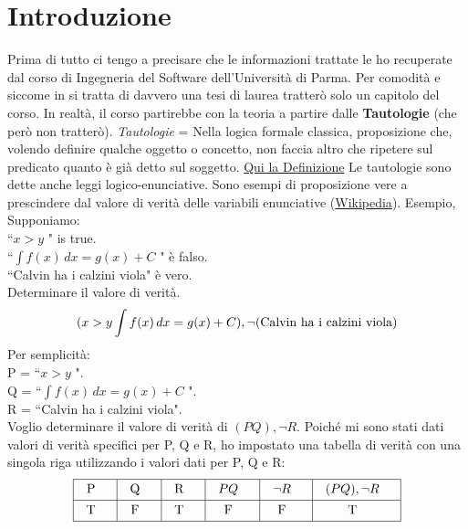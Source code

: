 \chapter*{Introduzione} %
Prima di tutto ci tengo a precisare che le informazioni trattate
le ho recuperate dal corso di Ingegneria del Software dell’Università di
Parma.
Per comodità e siccome in si tratta di davvero una tesi di laurea tratterò solo un capitolo del corso. 
\newline
In realtà, il corso partirebbe con la teoria a partire dalle \textbf{Tautologie} (che però non tratterò).
\newline
\emph{Tautologie} = Nella logica formale classica, proposizione che, volendo definire qualche oggetto o concetto, non faccia altro che ripetere sul predicato quanto è già detto sul soggetto. \href{https://www.google.com/search?q=Tautologie&oq=Tautologie&aqs=chrome..69i57j0i512l9.3456j1j15&sourceid=chrome&ie=UTF-8}{Qui la Definizione}
\newline
Le tautologie sono dette anche leggi logico-enunciative. Sono esempi di proposizione vere a prescindere dal valore di verità delle variabili enunciative (\href{https://it.wikipedia.org/wiki/Tautologia}{Wikipedia}).
%
\newline
\newline
%
Esempio, Supponiamo: \\
``$x > y$ " is true. \\
``$\displaystyle \int f(x)\,dx = g(x) + C$ " è falso. \\
``Calvin ha i calzini viola" è vero. \\
Determinare il valore di verità. \\
%
$$(x > y \int f(x)\,dx = g(x) + C),\lnot (\hbox{Calvin ha i calzini viola})$$
%
Per semplicità: \\
P = ``$x > y$ ". \\
Q = ``$\displaystyle \int f(x)\,dx = g(x) + C$ ". \\
R = ``Calvin ha i calzini viola". \\
%
Voglio determinare il valore di verità di $(PQ),\lnot R$. Poiché mi sono stati dati valori di verità specifici per P, Q e R, ho impostato una tabella di verità con una singola riga utilizzando i valori dati per P, Q e R:
%
$$\vbox{\offinterlineskip \halign{& \vrule # & \strut \hfil \quad # \quad \hfil \cr \noalign{\hrule} height2pt & \omit & & \omit & & \omit & & \omit & & \omit & & \omit & \cr & P & & Q & & R & & $PQ$ & & $\lnot R$ & & $(PQ),\lnot R$ & \cr height2pt & \omit & & \omit & & \omit & & \omit & & \omit & & \omit & \cr \noalign{\hrule} height2pt & \omit & & \omit & & \omit & & \omit & & \omit & & \omit & \cr & T & & F & & T & & F & & F & & T & \cr height2pt & \omit & & \omit & & \omit & & \omit & & \omit & & \omit & \cr \noalign{\hrule} }} $$
